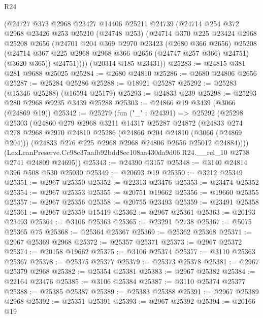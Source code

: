 \begin{lexlean}{R24}
\begin{coremodule}
        (@24727
          @373
          @2968
          @23427
          @14406
          @25211
          @24739
          (@24714
            @254
            @372
            @2968
            @23426
            @253
            @25210
            (@24748 @253)
            (@24714
              @370
              @225
              @23424
              @2968
              @25208
              @2656
              (@24701
                @204
                @369
                @2970
                @23423
                (@2680 @366 @2656)
                @25208
                (@24714 @367 @225 @2968 @2968 @366 @2656 (@24747 @257 @366) @24751)
                (@3620 @365))
              @24751))))
      (@20314 @185 @23431))
@25283 := @24815 @381 @281 @9688 @25025
@25284 := @2680 @24810
@25286 := @2680 @24806 @2656
@25287 := @25284 @25286
@25288 := @18921 @25287
@25292 := @25283 (@15346 @25288) (@16594 @25179)
@25293 := @24833 @239
@25298 := @25293 @280 @2968 @9235 @3439 @25288
@25303 := @24866 @19 @3439 (@3066 (@24869 @19))
@25342 := @25279
    (fun ("_" : @24391) =>
    @25292
      (@25298
        @25303
        (@24860
          @279
          @2968
          @3211
          @14317
          @25287
          @24872
          (@24833
            @274
            @278
            @2968
            @2970
            @24810
            @25286
            (@24866 @204 @24810 (@3066 (@24869 @204)))
            (@24833 @276 @225 @2968 @2968 @24806 @2656 @25012 @24884))))
      (LexLeanPreserve.Cc98c37aafb92bdd8ec108aa430da9d06.R24.__rel_10 @2738 @2741 @24809 @24695))
@25343 := @24390 @3157
@25348 := @3140 @24814 @396 @508 @530 @25030
@25349 := @20693 @19
@25350 := @3212 @25349
@25351 := @2967 @25350
@25352 := @22313 @23476
@25353 := @23474 @25352
@25354 := @2967 @25353
@25355 := @20751 @19662
@25356 := @19660 @25355
@25357 := @2967 @25356
@25358 := @20755 @23493
@25359 := @23491 @25358
@25361 := @2967 @25359 @15419
@25362 := @2967 @25361
@25363 := @20193 @23493
@25364 := @3106 @25363
@25365 := @23291 @2738
@25367 := @5075 @25365 @75
@25368 := @25364 @25367
@25369 := @25362 @25368
@25371 := @2967 @25369 @2968
@25372 := @25357 @25371
@25373 := @2967 @25372
@25374 := @20158 @19662
@25375 := @3106 @25374
@25377 := @3110 @25363 @25367
@25378 := @25375 @25377
@25379 := @25373 @25378
@25381 := @2967 @25379 @2968
@25382 := @25354 @25381
@25383 := @2967 @25382
@25384 := @22164 @23476
@25385 := @3106 @25384
@25387 := @3110 @25374 @25377
@25388 := @25385 @25387
@25389 := @25383 @25388
@25391 := @2967 @25389 @2968
@25392 := @25351 @25391
@25393 := @2967 @25392
@25394 := @20166 @19

\end{coremodule}
\end{lexlean}

